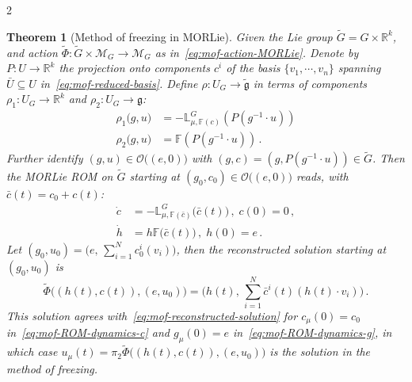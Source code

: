 \documentclass{article}
\newtheorem{theorem}{Theorem}[section]
\newcommand{\M}{\mathcal{M}}                                %
\newcommand{\g}{\mathfrak{g}}                               %
\newcommand{\R}{\mathbb{R}}                                 %
\begin{document}
\begin{multicols}{2}
\begin{theorem}[Method of freezing in MORLie]\label{thm:mof-morlie}
Given the Lie group $\widetilde{G} = G \times \R^k$, and action $\widetilde{\Phi}: \widetilde{G} \times \M_G \rightarrow \M_G$ as in~\eqref{eq:mof-action-MORLie}. 
Denote by $P:U\rightarrow\R^k$ the projection onto components $c^i$ of the basis $\{v_1,\cdots,v_n\}$ spanning $\bar{U}\subseteq U$ in~\eqref{eq:mof-reduced-basis}. 
Define $\rho:U_G \rightarrow \widetilde{\g}$ in terms of components $\rho_1:U_G \rightarrow \R^k$ and $\rho_2:U_G \rightarrow \g$:
\begin{align}
    \rho_1\big( g,u ) & = - \mathbb{L}^G_{\mu,\mathbb{F}(c)}(P(g^{-1}\cdot u))\\
    \rho_2\big( g,u ) & = \mathbb{F}(P(g^{-1}\cdot u)) \,.
\end{align}
Further identify $(g,u) \in \mathcal{O}\big((e,0)\big)$ with $(g,c) = (g, P(g^{-1}\cdot u))\in \widetilde{G}$. Then the MORLie ROM on $\widetilde{G}$ starting at $(g_0,c_0) \in \mathcal{O}\big((e,0)\big)$ reads, with $\bar{c}(t) = c_0 + c(t)$:
\begin{align} 
        \dot{c} &= - \mathbb{L}^G_{\mu,\mathbb{F}(\bar{c})}\big(\bar{c}(t)\big)\,,\; c(0) = 0\,, \\
        \dot{h} &= h \mathbb{F}\big(\bar{c}(t)\big)\,,\; h(0) = e\,.
\end{align} 
Let $(g_0,u_0) = \big( e, \, \sum_{i=1}^N c_0^i(v_i )\big)$, then the reconstructed solution starting at $(g_0,u_0)$ is
\begin{equation}\label{eq:thm:mof-morlie}
    \widetilde{\Phi}\big((h(t),c(t)),(e,u_0)\big) = \bigg(h(t), \, \sum_{i=1}^N \bar{c}^i(t)(h(t)\cdot v_i)\bigg) \,.
\end{equation}
This solution agrees with~\eqref{eq:mof-reconstructed-solution} for $c_\mu(0) = c_0$ in~\eqref{eq:mof-ROM-dynamics-c} and $g_\mu(0) = e$ in~\eqref{eq:mof-ROM-dynamics-g}, in which case $u_\mu(t) =\pi_2 \widetilde{\Phi}\big((h(t),c(t)),(e,u_0)\big)$ is the solution in the method of freezing.

\end{theorem}
\end{multicols}
\end{document}
